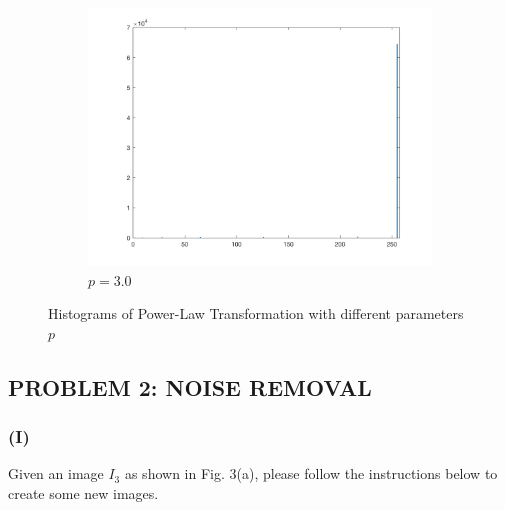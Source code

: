 \documentclass{article}
\begin{document}
\begin{enumerate}[label=(\alph*)]
\begin{figure}[!htb]
\begin{subfigure}[b]{0.3\textwidth}
            \includegraphics[width=\textwidth]{img/hist_PL30.png}
            \caption{$p = 3.0$}
        \end{subfigure}
        \caption{Histograms of Power-Law Transformation with different parameters $p$}
        \label{Histograms of Power-Law Transformation with different parameters $p$}        
    \end{figure}   
    
\end{enumerate}

\newpage

\subsection*{PROBLEM 2: NOISE REMOVAL}
\subsubsection*{(I)} Given an image $I_3$ as shown in Fig. 3(a), please follow the instructions below to create some new images.
\end{document}
